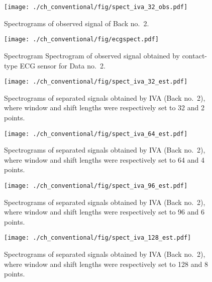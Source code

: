 \begin{figure}[tb]
\centering
\texttt{[image: ./ch\_conventional/fig/spect\_iva\_32\_obs.pdf]}
\caption{Spectrograms of observed signal of Back no.~2.}
\label{fig:siva32obs}
\end{figure}

\begin{figure}[tb]
\centering
\texttt{[image: ./ch\_conventional/fig/ecgspect.pdf]}
\caption{Spectrogram Spectrogram of observed signal obtained by contact-type ECG sensor for Data no.~2.}
\label{fig:ecgspect}
\end{figure}

\begin{figure}[tb]
\centering
\texttt{[image: ./ch\_conventional/fig/spect\_iva\_32\_est.pdf]}
\caption{Spectrograms of separated signals obtained by IVA (Back no.~2), where window and shift lengths were respectively set to 32 and 2 points.}
\label{fig:siva32est}
\end{figure}

\begin{figure}[tb]
\centering
\texttt{[image: ./ch\_conventional/fig/spect\_iva\_64\_est.pdf]}
\caption{Spectrograms of separated signals obtained by IVA (Back no.~2), where window and shift lengths were respectively set to 64 and 4 points.}
\label{fig:siva64est}
\end{figure}

\begin{figure}[tb]
\centering
\texttt{[image: ./ch\_conventional/fig/spect\_iva\_96\_est.pdf]}
\caption{Spectrograms of separated signals obtained by IVA (Back no.~2), where window and shift lengths were respectively set to 96 and 6 points.}
\label{fig:siva96est}
\end{figure}

\begin{figure}[tb]
\centering
\texttt{[image: ./ch\_conventional/fig/spect\_iva\_128\_est.pdf]}
\caption{Spectrograms of separated signals obtained by IVA (Back no.~2), where window and shift lengths were respectively set to 128 and 8 points.}
\label{fig:siva128est}
\end{figure}

